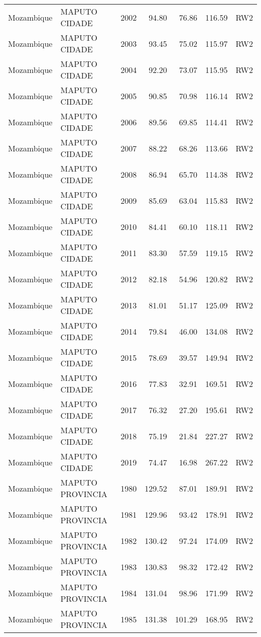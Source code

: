\begin{longtable}{lllrrrl}
  Mozambique & MAPUTO CIDADE & 2002 & 94.80 & 76.86 & 116.59 & RW2 \\ 
  Mozambique & MAPUTO CIDADE & 2003 & 93.45 & 75.02 & 115.97 & RW2 \\ 
  Mozambique & MAPUTO CIDADE & 2004 & 92.20 & 73.07 & 115.95 & RW2 \\ 
  Mozambique & MAPUTO CIDADE & 2005 & 90.85 & 70.98 & 116.14 & RW2 \\ 
  Mozambique & MAPUTO CIDADE & 2006 & 89.56 & 69.85 & 114.41 & RW2 \\ 
  Mozambique & MAPUTO CIDADE & 2007 & 88.22 & 68.26 & 113.66 & RW2 \\ 
  Mozambique & MAPUTO CIDADE & 2008 & 86.94 & 65.70 & 114.38 & RW2 \\ 
  Mozambique & MAPUTO CIDADE & 2009 & 85.69 & 63.04 & 115.83 & RW2 \\ 
  Mozambique & MAPUTO CIDADE & 2010 & 84.41 & 60.10 & 118.11 & RW2 \\ 
  Mozambique & MAPUTO CIDADE & 2011 & 83.30 & 57.59 & 119.15 & RW2 \\ 
  Mozambique & MAPUTO CIDADE & 2012 & 82.18 & 54.96 & 120.82 & RW2 \\ 
  Mozambique & MAPUTO CIDADE & 2013 & 81.01 & 51.17 & 125.09 & RW2 \\ 
  Mozambique & MAPUTO CIDADE & 2014 & 79.84 & 46.00 & 134.08 & RW2 \\ 
  Mozambique & MAPUTO CIDADE & 2015 & 78.69 & 39.57 & 149.94 & RW2 \\ 
  Mozambique & MAPUTO CIDADE & 2016 & 77.83 & 32.91 & 169.51 & RW2 \\ 
  Mozambique & MAPUTO CIDADE & 2017 & 76.32 & 27.20 & 195.61 & RW2 \\ 
  Mozambique & MAPUTO CIDADE & 2018 & 75.19 & 21.84 & 227.27 & RW2 \\ 
  Mozambique & MAPUTO CIDADE & 2019 & 74.47 & 16.98 & 267.22 & RW2 \\ 
  Mozambique & MAPUTO PROVINCIA & 1980 & 129.52 & 87.01 & 189.91 & RW2 \\ 
  Mozambique & MAPUTO PROVINCIA & 1981 & 129.96 & 93.42 & 178.91 & RW2 \\ 
  Mozambique & MAPUTO PROVINCIA & 1982 & 130.42 & 97.24 & 174.09 & RW2 \\ 
  Mozambique & MAPUTO PROVINCIA & 1983 & 130.83 & 98.32 & 172.42 & RW2 \\ 
  Mozambique & MAPUTO PROVINCIA & 1984 & 131.04 & 98.96 & 171.99 & RW2 \\ 
  Mozambique & MAPUTO PROVINCIA & 1985 & 131.38 & 101.29 & 168.95 & RW2 \\ 

\end{longtable}
